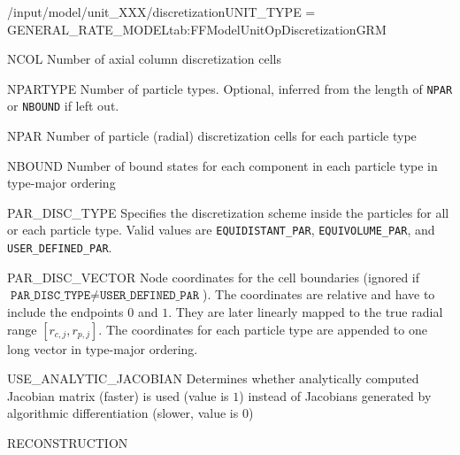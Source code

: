 \begin{condsubgroup}{/input/model/unit\_XXX/discretization}{UNIT\_TYPE = GENERAL\_RATE\_MODEL}{tab:FFModelUnitOpDiscretizationGRM}
  \begin{dataset}[type=int,range={$\geq 1$},length=1]{NCOL}
    Number of axial column discretization cells
  \end{dataset}
  \begin{dataset}[type=int,range={$\geq 1$},length=1]{NPARTYPE}
    Number of particle types.
    Optional, inferred from the length of \texttt{NPAR} or \texttt{NBOUND} if left out.
  \end{dataset}
  \begin{dataset}[type=int,range={$\geq 1$},length={$1$ / \texttt{NPARTYPE}}]{NPAR}
    Number of particle (radial) discretization cells for each particle type
  \end{dataset}
  \begin{dataset}[type=int,range={$\geq 0$},length={\texttt{NCOMP} / $\texttt{NPARTYPE} \cdot \texttt{NCOMP}$}]{NBOUND}
    Number of bound states for each component in each particle type in type-major ordering
  \end{dataset}
  \begin{dataset}[type=string,length={$1$ / \texttt{NPARTYPE}}]{PAR\_DISC\_TYPE}
    Specifies the discretization scheme inside the particles for all or each particle type.
    Valid values are \texttt{EQUIDISTANT\_PAR}, \texttt{EQUIVOLUME\_PAR}, and \texttt{USER\_DEFINED\_PAR}.
  \end{dataset}
  \begin{dataset}[unit=--,type=double,range={$[0,1]$},length={$\sum_i (\texttt{NPAR}_i + 1)$}]{PAR\_DISC\_VECTOR}
    Node coordinates for the cell boundaries (ignored if $\texttt{PAR\_DISC\_TYPE} \neq \texttt{USER\_DEFINED\_PAR}$).
    The coordinates are relative and have to include the endpoints $0$ and $1$.
    They are later linearly mapped to the true radial range $[r_{c,j}, r_{p,j}]$.
    The coordinates for each particle type are appended to one long vector in type-major ordering.
  \end{dataset}
  \begin{dataset}[type=int,range={$\{0, 1\}$},length=1]{USE\_ANALYTIC\_JACOBIAN}
    Determines whether analytically computed Jacobian matrix (faster) is used (value is $1$) instead of Jacobians generated by algorithmic differentiation (slower, value is $0$)
  \end{dataset}
  \begin{dataset}[type=string,range={\texttt{WENO}},length={1}]{RECONSTRUCTION}

\end{dataset}
\end{condsubgroup}
